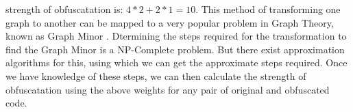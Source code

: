 \documentclass[twocolumn]{article}
\begin{document}
strength of obfuscatation is: $4 * 2 + 2 * 1 = 10$.
This method of transforming one graph to another can be mapped to a very popular problem in Graph Theory, known as Graph Minor \cite{graphminor}. Dtermining the steps required for the 
transformation to find the Graph Minor is a NP-Complete problem. But there exist approximation algorithms \cite{Demaine05} for this, using which we can get the approximate steps required. 
Once we have knowledge of these steps, we can then calculate the strength of obfuscatation using the above weights for any pair of original and obfuscated code.
\end{document}
